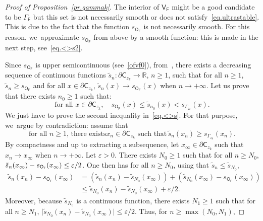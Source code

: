 \documentclass[10pt]{amsart}
\let\pa\partial
\let\ve\varepsilon
\theoremstyle{plain}
\theoremstyle{definition}
\begin{document}
\begin{proof}[Proof of Proposition~\ref{pr.gammak}]
The interior of $\mathsf V_{\mathsf F}$ might be a good candidate to be $\Gamma_{\mathsf F}$ but this set is not necessarily smooth or does not satisfy~\eqref{eq.ultrastable}. This is due to the fact that the function $s_{\mathsf O_{\mathsf F}}$ is not necessarily smooth. For this reason, we~approximate $s_{\mathsf O_{\mathsf F}}$ from above by a smooth function: this is made in
the next step, see~\eqref{eq.<>s2}.


Since $s_{\mathsf O_{\mathsf F}}$ is upper semicontinuous (see~\eqref{ofvf0}), from~\cite[Th.\,3]{tong1952some}, there exists a decreasing sequence of continuous functions $\tilde s_n:\pa \mathsf C_{z_k} \to \mathbb R$, $n\ge 1$, such that for all $n\ge 1$, $\tilde s_n\ge s_{\mathsf O_{\mathsf F}}$ and for all $x\in \pa \mathsf C_{z_k}$, $\tilde s_n(x)\to s_{\mathsf O_{\mathsf F}}(x)$ when $n\to +\infty$.
Let us prove that there exists $n_0\ge 1$ such that:
\begin{equation}\label{eq.<>s}
\text{for all } x\in \pa \mathsf C_{z_k}, \quad s_{\mathsf O_{\mathsf F}}(x)\le \tilde s_{n_0}(x)< s_{\Gamma_{z_k}}(x).
\end{equation}
We just have to prove the second inequality in~\eqref{eq.<>s}. For that purpose, we~argue by contradiction: assume that
\begin{equation}\label{geabs}
\text{for all $n\ge 1$, there exists
$x_n\in \pa \mathsf C_{z_k}$ such that}\, \tilde s_{n}(x_n)\ge s_{\Gamma_{z_k}}(x_n).
\end{equation}
By compactness and up to extracting a subsequence, let $x_{\infty}\!\in\! \pa { \mathsf C_{z_k}}$ such that \hbox{$x_n\!\to\! x_{\infty}$} when $n\to +\infty$. Let $\ve >0$. There exists $N_0\ge 1$ such that for all $n\ge N_0$, $\tilde s_{n}(x_{\infty})-\nobreak s_{\mathsf O_{\mathsf F}}(x_{\infty}) \le \ve/2$.
One then has for all $n\ge N_0$, using that $\tilde s_{n}\le \tilde s_{N_0}$,
\begin{align*}
\tilde s_{n}(x_n)- s_{\mathsf O_{\mathsf F}}(x_{\infty})&=(\tilde
s_{n}(x_n)-\tilde
s_{N_0}(x_{\infty}))+(\tilde
s_{N_0}(x_{\infty})-
s_{\mathsf
O_{\mathsf
F}}(x_{\infty}))\\
&\le \tilde s_{N_0}(x_n)-\tilde s_{N_0}(x_{\infty}) + \ve/2.
\end{align*}
Moreover, because $\tilde s_{N_0}$ is a continuous function, there exists $N_1\!\ge\! 1$ such that for all $n\ge N_1$, $\vert \tilde s_{N_0}(x_n)-\tilde s_{N_0}(x_{\infty})\vert \!\le\! \ve/2$. Thus, for $n\!\ge\! \max(N_0,N_1)$,

\end{proof}
\end{document}
